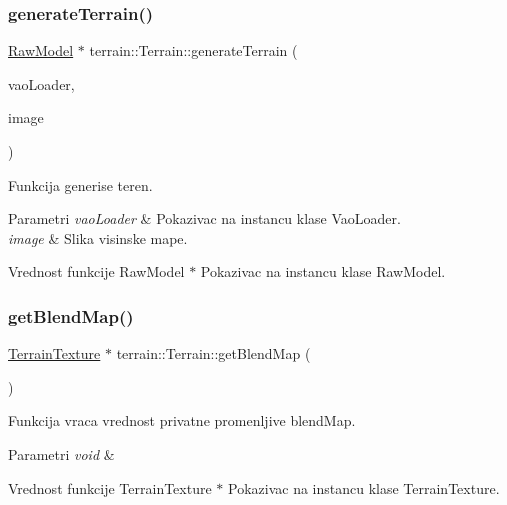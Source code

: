 \subsubsection{\texorpdfstring{generate\+Terrain()}{generateTerrain()}}
{\footnotesize\ttfamily \hyperlink{classmodel_1_1RawModel}{Raw\+Model} $\ast$ terrain\+::\+Terrain\+::generate\+Terrain (\begin{DoxyParamCaption}\item[{\hyperlink{classcore_1_1VaoLoader}{Vao\+Loader} $\ast$}]{vao\+Loader,  }\item[{Image}]{image }\end{DoxyParamCaption})\hspace{0.3cm}{\ttfamily [private]}}



Funkcija generise teren. 


\begin{DoxyParams}{Parametri}
{\em vao\+Loader} & Pokazivac na instancu klase Vao\+Loader. \\
\hline
{\em image} & Slika visinske mape. \\
\hline
\end{DoxyParams}
\begin{DoxyReturn}{Vrednost funkcije}
Raw\+Model $\ast$ Pokazivac na instancu klase Raw\+Model. 
\end{DoxyReturn}
\mbox{\label{classterrain_1_1Terrain_ae4d64fa4f81168a02887127491572cef}} 
\subsubsection{\texorpdfstring{get\+Blend\+Map()}{getBlendMap()}}
{\footnotesize\ttfamily \hyperlink{classtexture_1_1TerrainTexture}{Terrain\+Texture} $\ast$ terrain\+::\+Terrain\+::get\+Blend\+Map (\begin{DoxyParamCaption}{ }\end{DoxyParamCaption})}



Funkcija vraca vrednost privatne promenljive blend\+Map. 


\begin{DoxyParams}{Parametri}
{\em void} & \\
\hline
\end{DoxyParams}
\begin{DoxyReturn}{Vrednost funkcije}
Terrain\+Texture $\ast$ Pokazivac na instancu klase Terrain\+Texture. 
\end{DoxyReturn}
\mbox{\label{classterrain_1_1Terrain_a0707a64c79d89cfc358670651855cba1}} 
